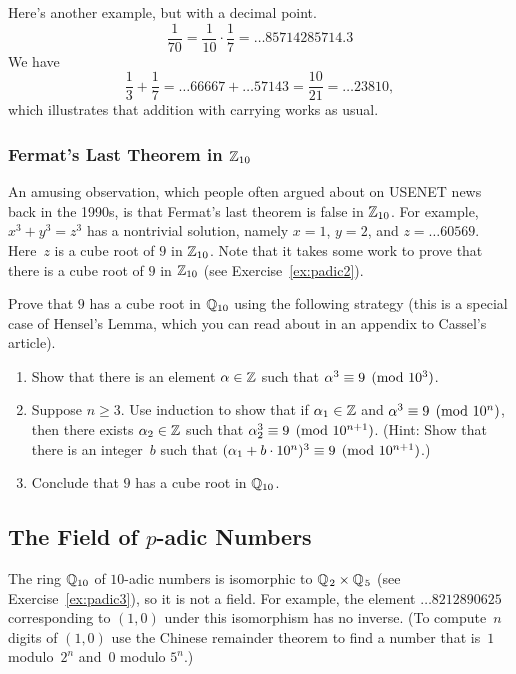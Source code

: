 Here's another example, but with a decimal point.
$$
\frac{1}{70} = \frac{1}{10}\cdot \frac{1}{7} = \ldots85714285714.3
$$
We have 
$$\frac{1}{3} + \frac{1}{7} = 
   \ldots66667 + \ldots57143 = \frac{10}{21} = \ldots 23810,
$$
which illustrates that addition with carrying works as usual.

\subsubsection{Fermat's Last Theorem in $\mathbb{Z}_{10}$}
An amusing observation, which people often argued about 
on USENET news back 
in the 1990s, is that Fermat's last theorem 
is false in $\mathbb{Z}_{10}$. For example, $x^3 + y^3 = z^3$ has a nontrivial solution, namely 
$x = 1$, $y=2$, and $z=\ldots60569$.   Here~$z$ is a cube
root of $9$ in $\mathbb{Z}_{10}$.  Note that it takes some work to prove that there
is a cube root of $9$ in $\mathbb{Z}_{10}$ (see Exercise~\ref{ex:padic2}).

\begin{exercise} \label{ex:topology6}
  Prove that $9$ has a cube root in $\mathbb{Q}_{10}$ using the following
  strategy (this is a special case of Hensel's Lemma, which you can
  read about in an appendix to Cassel's article).

\begin{enumerate}
\item Show that there is an element $\alpha\in\mathbb{Z}$ such that $\alpha^3\equiv 9\pmod{10^3}$. 
\item Suppose $n\geq 3$. 
Use induction to show that if $\alpha_1\in\mathbb{Z}$ and 
$\alpha^3\equiv 9\pmod{10^n}$,  then there exists $\alpha_2\in\mathbb{Z}$ such 
that $\alpha_2^3\equiv 9\pmod{10^{n+1}}$.
(Hint: Show that there is an integer~$b$ such that
$(\alpha_1 + b\cdot 10^{n})^3 \equiv 9\pmod{10^{n+1}}$.)
\item Conclude that $9$ has a cube root in $\mathbb{Q}_{10}$.
\end{enumerate}
\end{exercise}



\subsection{The Field of $p$-adic Numbers}
The ring $\mathbb{Q}_{10}$ of $10$-adic numbers is isomorphic to
$\mathbb{Q}_{\hspace{.2ex}2}\times\mathbb{Q}_{\hspace{.2ex}5}$ (see Exercise~\ref{ex:padic3}), so it is not a
field.  For example, the element $\ldots8212890625$ corresponding to
$(1,0)$ under this isomorphism has no inverse.  (To compute~$n$ digits
of $(1,0)$ use the Chinese remainder theorem to find a number that
is~$1$ modulo~$2^{n}$ and~$0$ modulo $5^n$.)  

